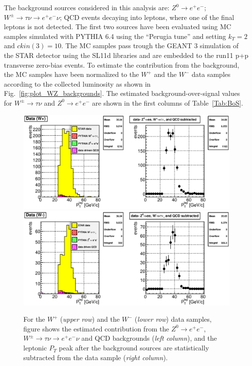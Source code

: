 \documentclass[12pt]{article}
\begin{document}
The background sources considered in this analysis are: 
$Z^{0} \rightarrow e^+e^-$; 
$W^{\pm} \rightarrow \tau\nu \rightarrow e^+e^-\nu$; 
QCD events decaying into leptons, where one of the final leptons is not detected.
The first two sources have been evaluated using MC samples simulated with PYTHIA 6.4 using the ``Perugia tune'' and setting $k_{T}=2$ and $ckin(3)=10$. The MC samples pass trough the GEANT 3 simulation of the STAR detector using the SL11d libraries and are embedded to the run11 p+p transverse zero-bias events. To estimate the contribution from the background, the MC samples have been normalized to the $W^{+}$ and the $W^{-}$ data samples according to the collected luminosity as shown in Fig.~\ref{fig:plot_WZ_backgrounds}. The estimated background-over-signal values for $W^{\pm} \rightarrow \tau\nu$ and $Z^{0} \rightarrow e^+e^-$ are shown in the first columns of Table~\ref{Tab:BoS}. 

\begin{figure}[htbp]
\begin{center}
\includegraphics[scale=0.8]{images/backgrounds/plot_5}
\includegraphics[scale=0.8]{images/backgrounds/plot_7}
\end{center}
\caption{For the $W^{+}$ ({\it upper row}) and the $W^{-}$ ({\it lower row}) data samples, figure shows the estimated contribution from the $Z^{0} \rightarrow e^+e^-$, $W^{\pm} \rightarrow \tau\nu \rightarrow e^+e^-\nu$ and QCD backgrounds ({\it left column}), and the leptonic $P_{T}$ peak after the background sources are statistically subtracted from the data sample ({\it right column}).}
\label{fig:plot_QCD_bkd_pt25} 
\end{figure}
\end{document}
